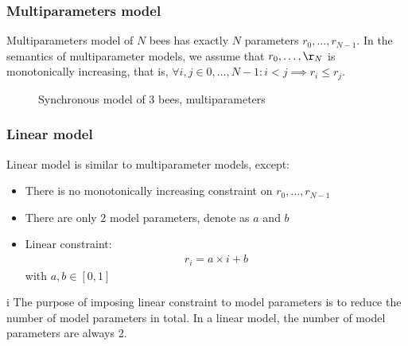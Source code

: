 \documentclass[12pt]{article}
\theoremstyle{definition}
\begin{document}
\subsubsection{Multiparameters model}
Multiparameters model of $N$ bees has exactly $N$ parameters $r_0,\ldots,r_{N-1}$.
In the semantics of multiparameter models, we assume that $r_0,\ldots,\r_N$ is
monotonically increasing, that is, $\forall i,j\in {0,\ldots,N-1}: i < j \implies
r_i \leq r_j$. 
\begin{figure}[H]
  \centering 
  \caption{Synchronous model of 3 bees, multiparameters}
\end{figure}

\subsubsection{Linear model}
Linear model is similar to multiparameter models, except:
\begin{itemize}
\item There is no monotonically increasing constraint on $r_0,\ldots,r_{N-1}$
\item There are only 2 model parameters, denote as $a$ and $b$
\item Linear constraint:
  \begin{align*}
    r_i = a \times i + b
  \end{align*}
  with $a,b \in [0,1]$
\end{itemize}i
The purpose of imposing  linear constraint to model parameters is to reduce the
number of model parameters in total. In a linear model, the number of model
parameters are always 2.
\end{document}
